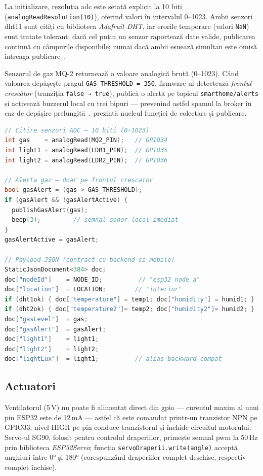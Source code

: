 La inițializare, rezoluția \gls{adc} este setată explicit la 10 biți
(\texttt{analogReadResolution(10)}), oferind valori în intervalul 0–1023.
Ambii senzori \gls{dht}11 sunt citiți cu biblioteca \emph{Adafruit DHT},
iar erorile temporare (valori \texttt{NaN}) sunt tratate tolerant:
dacă cel puțin un senzor raportează date valide, publicarea continuă cu
câmpurile disponibile; numai dacă ambii eșuează simultan este omisă
întreaga publicare~\cite{aosong2019dht11}.

Senzorul de gaz MQ-2 returnează o valoare analogică brută (0–1023).
Când valoarea depășește pragul \texttt{GAS\_THRESHOLD = 350}, firmware-ul
detectează \emph{frontul crescător} (tranziția \texttt{false → true}),
publică o alertă pe topicul \texttt{smarthome/alerts} și activează
buzzerul local cu trei bipuri — prevenind astfel spamul la broker în caz
de depășire prelungită~\cite{hanwei2020mq2}.
 prezintă nucleul funcției de colectare
și publicare.

\begin{lstlisting}[language=C++,
  caption={Fragment din \texttt{publishSensors()} — citire DHT11, MQ-2,
           LDR și construire payload JSON (esp32\_node.ino).},
  label=lst:publish-sensors]
// Citire senzori ADC — 10 biti (0-1023)
int gas    = analogRead(MQ2_PIN);   // GPIO34
int light1 = analogRead(LDR1_PIN);  // GPIO35
int light2 = analogRead(LDR2_PIN);  // GPIO36

// Alerta gaz — doar pe frontul crescator
bool gasAlert = (gas > GAS_THRESHOLD);
if (gasAlert && !gasAlertActive) {
  publishGasAlert(gas);
  beep(3);         // semnal sonor local imediat
}
gasAlertActive = gasAlert;

// Payload JSON (contract cu backend si mobile)
StaticJsonDocument<384> doc;
doc["nodeId"]    = NODE_ID;          // "esp32_node_a"
doc["location"]  = LOCATION;        // "interior"
if (dht1ok) { doc["temperature"] = temp1; doc["humidity"] = humid1; }
if (dht2ok) { doc["temperature2"]= temp2; doc["humidity2"]= humid2; }
doc["gasLevel"]  = gas;
doc["gasAlert"]  = gasAlert;
doc["light1"]    = light1;
doc["light2"]    = light2;
doc["lightLux"]  = light1;          // alias backward-compat
\end{lstlisting}

\subsection{Actuatori}
\label{sec:actuatori}

Ventilatorul (5\,V) nu poate fi alimentat direct din \gls{gpio} —
curentul maxim al unui pin ESP32 este de 12\,mA — astfel că este comandat
printr-un tranzistor NPN pe GPIO33: nivel HIGH pe pin conduce tranzistorul
și închide circuitul motorului.
Servo-ul SG90, folosit pentru controlul draperiilor, primește semnal
\gls{pwm} la 50\,Hz prin biblioteca \emph{ESP32Servo}; funcția
\texttt{servoDraperii.write(angle)} acceptă unghiuri între 0° și 180°
(corespunzând draperiilor complet deschise, respectiv complet închise).

